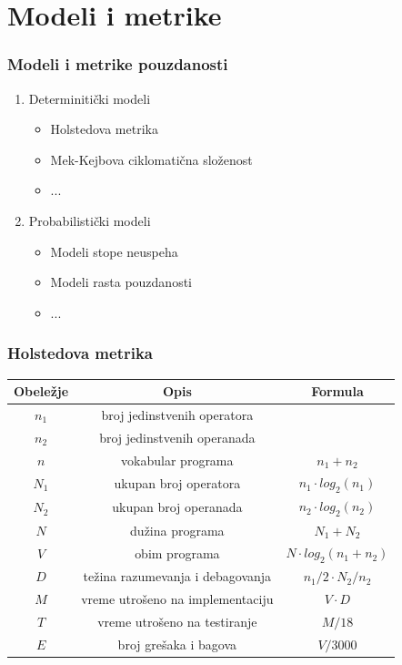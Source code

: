 \documentclass{beamer}
\begin{document}
\section{Modeli i metrike}
\begin{frame}
\frametitle{Modeli i metrike pouzdanosti}

\begin{enumerate}
\item Determinitički modeli
\begin{itemize}
\item Holstedova metrika
\item Mek-Kejbova ciklomatična složenost
\item ...
\end{itemize}
\item Probabilistički modeli
\begin{itemize}
\item Modeli stope neuspeha
\item Modeli rasta pouzdanosti
\item ...
\end{itemize}
\end{enumerate}

\end{frame}


\begin{frame}
\frametitle{Holstedova metrika}

\begin{table}[h]
\centering
 \begin{tabular}{|c|c|c|}
  \hline
  Obeležje & Opis & Formula \\ [0ex]
  \hline $n_1$ & broj jedinstvenih operatora & \\ 
  \hline $n_2$ & broj jedinstvenih operanada & \\ 
  \hline $n$ & vokabular programa & $ n_1 + n_2 $ \\ 
  \hline $N_1$ & ukupan broj operatora & $ n_1 \cdot log_2(n_1) $ \\ 
  \hline $N_2$ & ukupan broj operanada & $ n_2 \cdot log_2(n_2) $ \\ 
  \hline $N$ & dužina programa & $ N_1 + N_2 $ \\
  \hline $V$ & obim programa & $ N \cdot log_2(n_1+n_2) $ \\
  \hline $D$ & težina razumevanja i debagovanja & $ n_1/2 \cdot N_2 / n_2  $ \\
  \hline $M$ & vreme utrošeno na implementaciju & $ V \cdot D $ \\
  \hline $T$ & vreme utrošeno na testiranje & $ M / 18 $ \\
  \hline $E$ & broj grešaka i bagova & $ V / 3000 $ \\
  \hline
 \end{tabular}
\end{table}
\end{frame}
\end{document}
